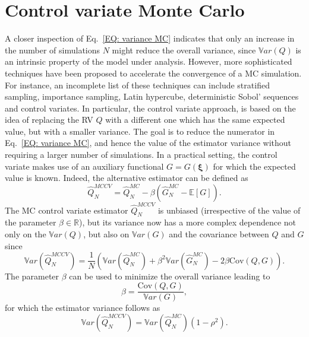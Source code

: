 \section{Control variate Monte Carlo} \label{uq:sampling:controlvariate}
A closer inspection of Eq.~\eqref{EQ: variance MC} indicates that only an increase in the number of simulations $N$ 
might reduce the overall variance, since $\mathbb{V}ar\left({Q}\right)$ is an intrinsic property of the model under analysis. However, 
more sophisticated  techniques have been proposed to accelerate the convergence of a MC simulation. For instance, an incomplete list 
of these techniques can include stratified sampling, importance sampling, Latin hypercube, deterministic Sobol' 
sequences and control variates. In particular, the control variate approach, is based on the idea of replacing
the RV $Q$ with a different one which has the same expected value, but with a smaller variance.
The goal is to reduce the numerator in Eq.~\eqref{EQ: variance MC}, and hence the value of the estimator variance without
requiring a larger number of simulations.
In a practical setting, the control variate makes use of an auxiliary functional $G=G(\boldsymbol{\xi})$ for which the 
expected value is known. Indeed, the alternative estimator can be defined as
\begin{equation} \label{EQ: control variate}
\hat{Q}_N^{MCCV} =  \hat{Q}_N^{MC} - \beta \left( \hat{G}_N^{MC} - \mathbb{E}\left[G\right] \right).
\end{equation}
The MC control variate estimator $\hat{Q}_N^{MCCV}$ is unbiased (irrespective of the value of the parameter 
$\beta \in \mathbb{R}$), but its variance now has a more complex dependence not only 
on the $\mathbb{V}ar\left({Q}\right)$, but also on $\mathbb{V}ar\left(G\right)$ and the covariance between $Q$ and $G$ since
\begin{equation}
 \mathbb{V}ar\left(\hat{Q}_N^{MCCV}\right) = \dfrac{1}{N} \left( \mathbb{V}ar\left( \hat{Q}_N^{MC} \right) + \beta^2 \mathbb{V}ar\left( \hat{G}_N^{MC} \right) - 2\beta \mathrm{Cov}\left(Q,G\right) \right).
\end{equation}
The parameter $\beta$ can be used to minimize the overall variance leading to 
\begin{equation}
\beta = \dfrac{ \mathrm{Cov}\left(Q,G\right) }{ \mathbb{V}ar\left( G \right) }, 
\end{equation}
for which the estimator variance follows as
\begin{equation}
 \mathbb{V}ar\left({\hat{Q}_N^{MCCV}}\right) = \mathbb{V}ar\left({\hat{Q}_N^{MC}}\right)\left( 1-\rho^2 \right).
\end{equation}
